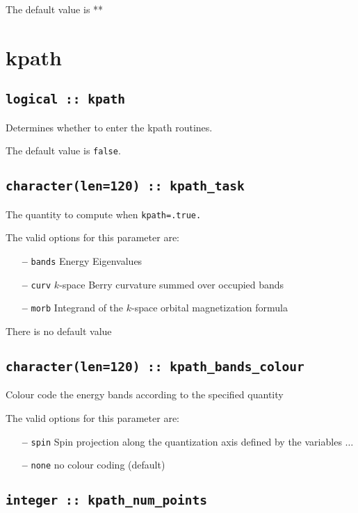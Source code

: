 The default value is **



\clearpage
\section{kpath}

\subsection[berry]{\tt logical :: kpath}
Determines whether to enter the kpath routines.

The default value is \verb#false#.


\subsection[kpath\_task]{\tt character(len=120) ::  kpath\_task} 
The quantity to compute when {\tt kpath=.true.} 

The valid options for this parameter are:
\begin{itemize}
\item[{\bf --}]  \verb#bands# Energy Eigenvalues
\item[{\bf --}] \verb#curv# $k$-space Berry curvature summed over
  occupied bands
\item[{\bf --}] \verb#morb#  Integrand of the $k$-space orbital
  magnetization formula
\end{itemize}
There is no default value

\subsection[kpath\_colour]{\tt character(len=120) ::  kpath\_bands\_colour}
Colour code the energy bands according to the specified quantity

The valid options for this parameter are:
\begin{itemize}
\item[{\bf --}]  \verb#spin# Spin projection along the quantization axis
defined by the variables $\ldots$
\item[{\bf --}]  \verb#none# no colour coding (default)
\end{itemize}


\subsection[kpath\_num\_points]{\tt integer :: kpath\_num\_points}

